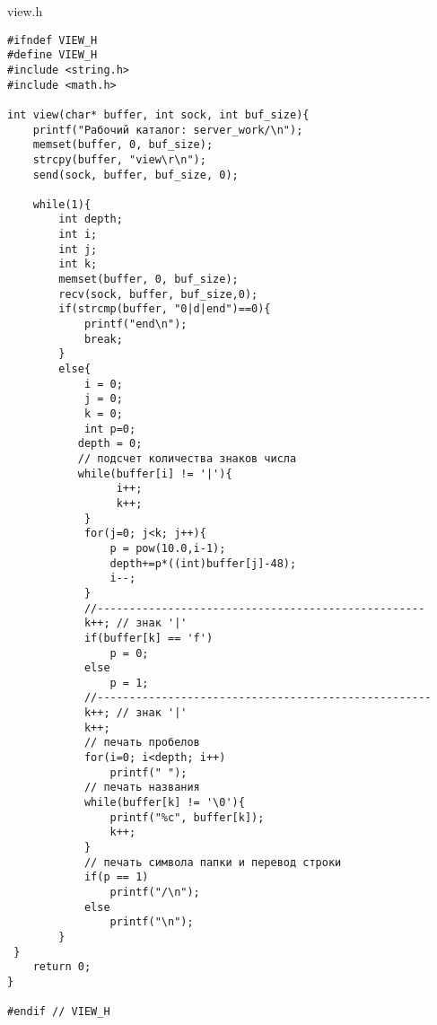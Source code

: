 \documentclass[12pt,a4paper]{report}
\begin{document}
view.h
\begin{lstlisting}
#ifndef VIEW_H
#define VIEW_H
#include <string.h>
#include <math.h>

int view(char* buffer, int sock, int buf_size){
    printf("Рабочий каталог: server_work/\n");
    memset(buffer, 0, buf_size);
    strcpy(buffer, "view\r\n");
    send(sock, buffer, buf_size, 0);

    while(1){
        int depth;
        int i;
        int j;
        int k;
        memset(buffer, 0, buf_size);
        recv(sock, buffer, buf_size,0);
        if(strcmp(buffer, "0|d|end")==0){
            printf("end\n");
            break;
        }
        else{
            i = 0;
            j = 0;
            k = 0;
            int p=0;
           depth = 0;
           // подсчет количества знаков числа
           while(buffer[i] != '|'){
                 i++;
                 k++;
            }
            for(j=0; j<k; j++){
                p = pow(10.0,i-1);
                depth+=p*((int)buffer[j]-48);
                i--;
            }
            //---------------------------------------------------
            k++; // знак '|'
            if(buffer[k] == 'f')
                p = 0;
            else
                p = 1;
            //----------------------------------------------------
            k++; // знак '|'
            k++;
            // печать пробелов
            for(i=0; i<depth; i++)
                printf(" ");
            // печать названия
            while(buffer[k] != '\0'){
                printf("%c", buffer[k]);
                k++;
            }
            // печать символа папки и перевод строки
            if(p == 1)
                printf("/\n");
            else
                printf("\n");
        }
 }
    return 0;
}

#endif // VIEW_H
\end{lstlisting}
\end{document}
